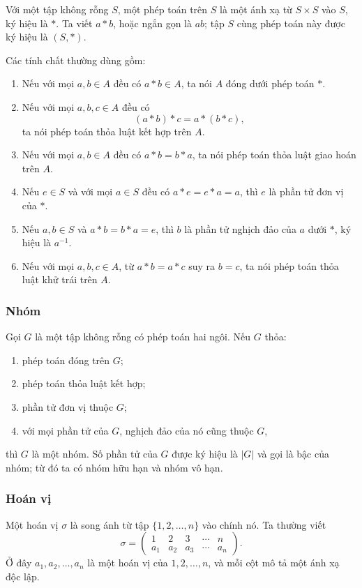 \documentclass[11pt]{article}
\begin{document}
Với một tập không rỗng \(S\), một phép toán trên \(S\) là một ánh xạ từ
\(S\times S\) vào \(S\), ký hiệu là \(*\). Ta viết \(a*b\), hoặc ngắn gọn là
\(ab\); tập \(S\) cùng phép toán này được ký hiệu là \((S,*)\).

Các tính chất thường dùng gồm:
\begin{enumerate}
  \item Nếu với mọi \(a,b\in A\) đều có \(a*b\in A\), ta nói \(A\) đóng dưới
  phép toán \(*\).
  \item Nếu với mọi \(a,b,c\in A\) đều có
  \[
    (a*b)*c=a*(b*c),
  \]
  ta nói phép toán thỏa luật kết hợp trên \(A\).
  \item Nếu với mọi \(a,b\in A\) đều có \(a*b=b*a\), ta nói phép toán thỏa
  luật giao hoán trên \(A\).
  \item Nếu \(e\in S\) và với mọi \(a\in S\) đều có
  \(a*e=e*a=a\), thì \(e\) là phần tử đơn vị của \(*\).
  \item Nếu \(a,b\in S\) và \(a*b=b*a=e\), thì \(b\) là phần tử nghịch đảo của
  \(a\) dưới \(*\), ký hiệu là \(a^{-1}\).
  \item Nếu với mọi \(a,b,c\in A\), từ \(a*b=a*c\) suy ra \(b=c\), ta nói
  phép toán thỏa luật khử trái trên \(A\).
\end{enumerate}

\subsubsection{Nhóm}

Gọi \(G\) là một tập không rỗng có phép toán hai ngôi. Nếu \(G\) thỏa:
\begin{enumerate}
  \item phép toán đóng trên \(G\);
  \item phép toán thỏa luật kết hợp;
  \item phần tử đơn vị thuộc \(G\);
  \item với mọi phần tử của \(G\), nghịch đảo của nó cũng thuộc \(G\),
\end{enumerate}
thì \(G\) là một nhóm. Số phần tử của \(G\) được ký hiệu là \(|G|\) và gọi là
bậc của nhóm; từ đó ta có nhóm hữu hạn và nhóm vô hạn.

\subsubsection{Hoán vị}

Một hoán vị \(\sigma\) là song ánh từ tập \(\{1,2,\ldots,n\}\) vào chính nó.
Ta thường viết
\[
  \sigma =
  \begin{pmatrix}
    1 & 2 & 3 & \cdots & n\\
    a_1 & a_2 & a_3 & \cdots & a_n
  \end{pmatrix}.
\]
Ở đây \(a_1,a_2,\ldots,a_n\) là một hoán vị của \(1,2,\ldots,n\), và mỗi cột
mô tả một ánh xạ độc lập.
\end{document}
